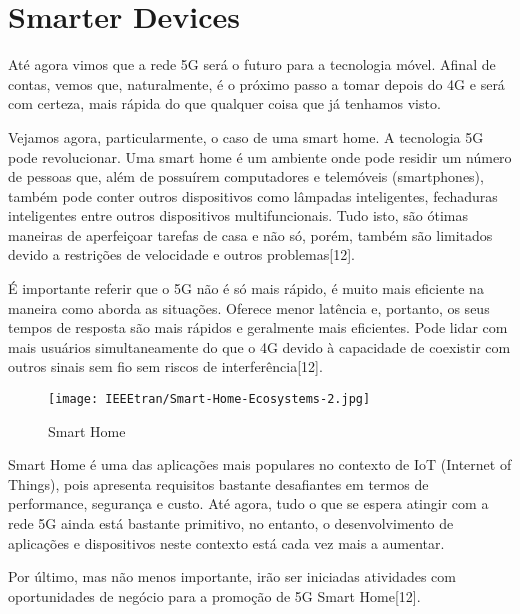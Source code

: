 \documentclass[conference]{IEEEtran}
\begin{document}
\section{Smarter Devices}
Até agora vimos que a rede 5G será o futuro para a tecnologia móvel. Afinal de contas, vemos que, naturalmente, é o próximo passo a tomar depois do 4G e será com certeza, mais rápida do que qualquer coisa que já tenhamos visto.\par
Vejamos agora, particularmente, o caso de uma smart home. A tecnologia 5G pode revolucionar. Uma smart home é um ambiente onde pode residir um número de pessoas que, além de possuírem computadores e telemóveis (smartphones), também pode conter outros dispositivos como lâmpadas inteligentes, fechaduras inteligentes entre outros dispositivos multifuncionais. Tudo isto, são ótimas maneiras de aperfeiçoar tarefas de casa e não só, porém, também são limitados devido a restrições de velocidade e outros problemas[12].\par
É importante referir que o 5G não é só mais rápido, é muito mais eficiente na maneira como aborda as situações. Oferece menor latência e, portanto, os seus tempos de resposta são mais rápidos e geralmente mais eficientes. Pode lidar com mais usuários simultaneamente do que o 4G devido à capacidade de coexistir com outros sinais sem fio sem riscos de interferência[12]. 
\begin{figure}[ht]
    \centering
    \texttt{[image: IEEEtran/Smart-Home-Ecosystems-2.jpg]}
    \caption{Smart Home}
\end{figure}
Smart Home é uma das aplicações mais populares no contexto de IoT (Internet of Things), pois apresenta requisitos bastante desafiantes em termos de performance, segurança e custo.  Até agora, tudo o que se espera atingir com a rede 5G ainda está bastante primitivo, no entanto, o desenvolvimento de aplicações e dispositivos neste contexto está cada vez mais a aumentar. \par
Por último, mas não menos importante, irão ser iniciadas atividades com oportunidades de negócio  para a promoção de 5G Smart Home[12].
\end{document}
